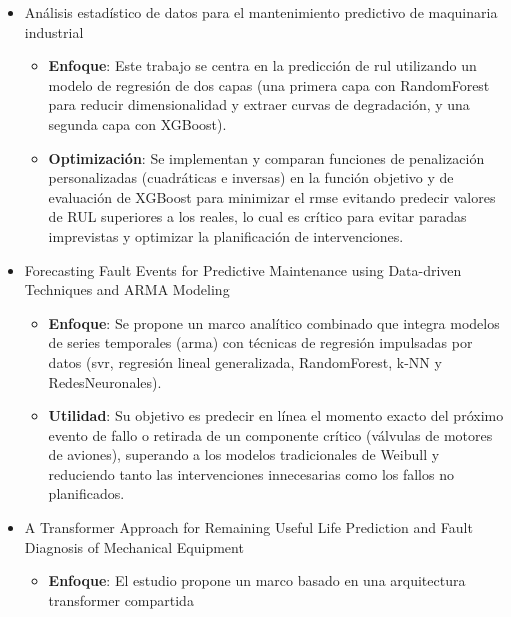 \documentclass[IB]{TFUOC}
\begin{document}
\begin{itemize}
  \item Análisis estadístico de datos para el mantenimiento predictivo de maquinaria industrial \cite{brasa2019analisis}
        \begin{itemize}
          \item \textbf{Enfoque}: Este trabajo se centra en la predicción de \gls{rul} utilizando un modelo de regresión
                de dos capas (una primera capa con \gls{RandomForest} para reducir dimensionalidad y extraer curvas de
                degradación, y una segunda capa con \gls{XGBoost}).
          \item \textbf{Optimización}: Se implementan y comparan funciones de penalización personalizadas (cuadráticas e
                inversas) en la función objetivo y de evaluación de \gls{XGBoost} para minimizar el \gls{rmse} evitando
                predecir valores de RUL superiores a los reales, lo cual es crítico para evitar paradas imprevistas y
                optimizar la planificación de intervenciones.
        \end{itemize}
  \item Forecasting Fault Events for Predictive Maintenance using Data-driven Techniques and ARMA Modeling
        \cite{baptista2017forecasting}
        \begin{itemize}
          \item \textbf{Enfoque}: Se propone un marco analítico combinado que integra modelos de series temporales
                (\gls{arma}) con técnicas de regresión impulsadas por datos (\gls{svr}, regresión lineal generalizada,
                \gls{RandomForest}, k-NN y \gls{RedesNeuronales}).
          \item \textbf{Utilidad}: Su objetivo es predecir en línea el momento exacto del próximo evento de fallo o
                retirada de un componente crítico (válvulas de motores de aviones), superando a los modelos
                tradicionales de Weibull y reduciendo tanto las intervenciones innecesarias como los fallos no
                planificados.
        \end{itemize}
  \item A Transformer Approach for Remaining Useful Life Prediction and Fault Diagnosis of Mechanical Equipment
        \cite{liu2026transformer}
        \begin{itemize}
          \item \textbf{Enfoque}: El estudio propone un marco basado en una arquitectura \gls{transformer} compartida

\end{itemize}
\end{itemize}
\end{document}

